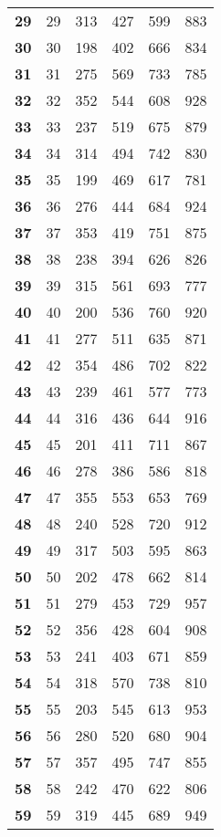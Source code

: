 \begin{longtable}{|l|c|c|c|c|c|}
  \textbf{29} & 29 &313 & 427 & 599 & 883 \\
  \textbf{30} & 30 &198 & 402 & 666 & 834 \\
  \textbf{31} & 31 &275 & 569 & 733 & 785 \\
  \textbf{32} & 32 &352 & 544 & 608 & 928 \\
  \textbf{33} & 33 &237 & 519 & 675 & 879 \\
  \textbf{34} & 34 &314 & 494 & 742 & 830 \\
  \textbf{35} & 35 &199 & 469 & 617 & 781 \\
  \textbf{36} & 36 &276 & 444 & 684 & 924 \\
  \textbf{37} & 37 &353 & 419 & 751 & 875 \\
  \textbf{38} & 38 &238 & 394 & 626 & 826 \\
  \textbf{39} & 39 &315 & 561 & 693 & 777 \\
  \textbf{40} & 40 &200 & 536 & 760 & 920 \\
  \textbf{41} & 41 &277 & 511 & 635 & 871 \\
  \textbf{42} & 42 &354 & 486 & 702 & 822 \\
  \textbf{43} & 43 &239 & 461 & 577 & 773 \\
  \textbf{44} & 44 &316 & 436 & 644 & 916 \\
  \textbf{45} & 45 &201 & 411 & 711 & 867 \\
  \textbf{46} & 46 &278 & 386 & 586 & 818 \\
  \textbf{47} & 47 &355 & 553 & 653 & 769 \\
  \textbf{48} & 48 &240 & 528 & 720 & 912 \\
  \textbf{49} & 49 &317 & 503 & 595 & 863 \\
  \textbf{50} & 50 &202 & 478 & 662 & 814 \\
  \textbf{51} & 51 &279 & 453 & 729 & 957 \\
  \textbf{52} & 52 &356 & 428 & 604 & 908 \\
  \textbf{53} & 53 &241 & 403 & 671 & 859 \\
  \textbf{54} & 54 &318 & 570 & 738 & 810 \\
  \textbf{55} & 55 &203 & 545 & 613 & 953 \\
  \textbf{56} & 56 &280 & 520 & 680 & 904 \\
  \textbf{57} & 57 &357 & 495 & 747 & 855 \\
  \textbf{58} & 58 &242 & 470 & 622 & 806 \\
  \textbf{59} & 59 &319 & 445 & 689 & 949 \\

\end{longtable}
